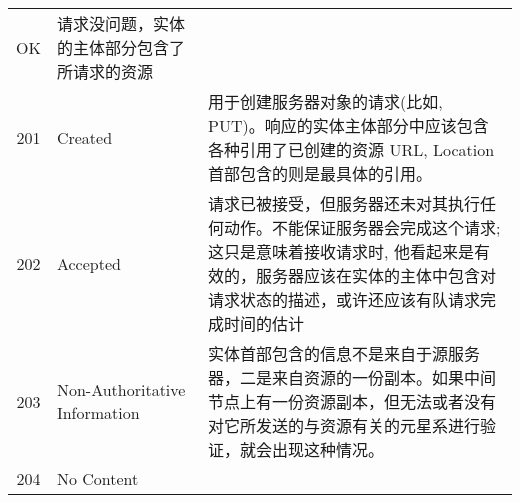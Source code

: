 \begin{longtable}[]{@{}cll@{}}
\begin{minipage}[t]{0.30\columnwidth}
OK\strut
\end{minipage} & \begin{minipage}[t]{0.30\columnwidth}\raggedright\strut
请求没问题，实体的主体部分包含了所请求的资源\strut
\end{minipage}\tabularnewline
\begin{minipage}[t]{0.32\columnwidth}\centering\strut
201\strut
\end{minipage} & \begin{minipage}[t]{0.30\columnwidth}\raggedright\strut
Created\strut
\end{minipage} & \begin{minipage}[t]{0.30\columnwidth}\raggedright\strut
用于创建服务器对象的请求(比如,
PUT)。响应的实体主体部分中应该包含各种引用了已创建的资源 URL, Location
首部包含的则是最具体的引用。\strut
\end{minipage}\tabularnewline
\begin{minipage}[t]{0.32\columnwidth}\centering\strut
202\strut
\end{minipage} & \begin{minipage}[t]{0.30\columnwidth}\raggedright\strut
Accepted\strut
\end{minipage} & \begin{minipage}[t]{0.30\columnwidth}\raggedright\strut
请求已被接受，但服务器还未对其执行任何动作。不能保证服务器会完成这个请求;
这只是意味着接收请求时,
他看起来是有效的，服务器应该在实体的主体中包含对请求状态的描述，或许还应该有队请求完成时间的估计\strut
\end{minipage}\tabularnewline
\begin{minipage}[t]{0.32\columnwidth}\centering\strut
203\strut
\end{minipage} & \begin{minipage}[t]{0.30\columnwidth}\raggedright\strut
Non-Authoritative Information\strut
\end{minipage} & \begin{minipage}[t]{0.30\columnwidth}\raggedright\strut
实体首部包含的信息不是来自于源服务器，二是来自资源的一份副本。如果中间节点上有一份资源副本，但无法或者没有对它所发送的与资源有关的元星系进行验证，就会出现这种情况。\strut
\end{minipage}\tabularnewline
\begin{minipage}[t]{0.32\columnwidth}\centering\strut
204\strut
\end{minipage} & \begin{minipage}[t]{0.30\columnwidth}\raggedright\strut
No Content\strut
\end{minipage} & \begin{minipage}[t]{0.30\columnwidth}\raggedright\strut

\end{minipage}
\end{longtable}
